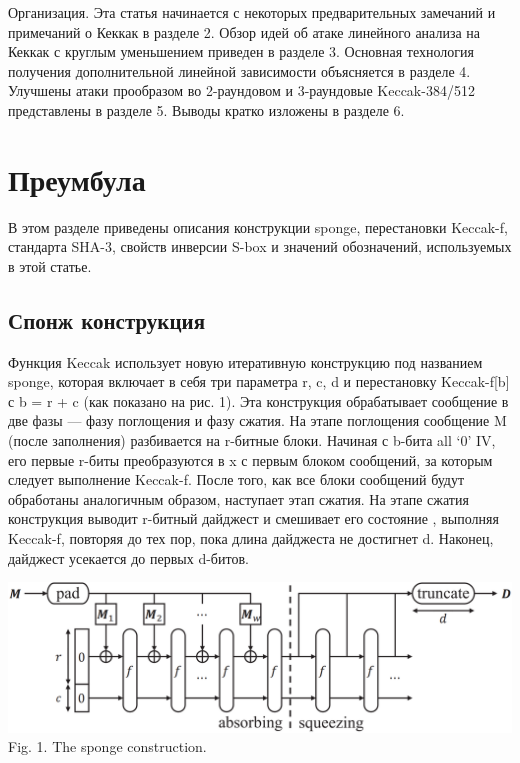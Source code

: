 \documentclass[utf8,14pt,a4paper,oneside,russian]{book}
\begin{document}
Организация. Эта статья начинается с некоторых предварительных замечаний и примечаний о
Кеккак в разделе 2. Обзор идей об атаке линейного анализа на
Кеккак с круглым уменьшением приведен в разделе 3. Основная технология получения дополнительной линейной
зависимости объясняется в разделе 4. Улучшены атаки прообразом во 2-раундовом и
3-раундовые Keccak-384/512 представлены в разделе 5. Выводы кратко
изложены в разделе 6.

\section*{Преумбула}

В этом разделе приведены описания конструкции sponge, перестановки Keccak-f, стандарта SHA-3, свойств инверсии S-box и значений
обозначений, используемых в этой статье.

\subsection*{Спонж конструкция}

Функция Keccak использует новую итеративную конструкцию под названием sponge, которая
включает в себя три параметра r, c, d и перестановку Keccak-f[b] с b = r + c
(как показано на рис. 1). Эта конструкция обрабатывает сообщение в две фазы —
фазу поглощения и фазу сжатия. На этапе поглощения сообщение M (после
заполнения) разбивается на r-битные блоки. Начиная с b-бита all ‘0’ IV, его первые r-биты
преобразуются в x с первым блоком сообщений, за которым следует выполнение Keccak-f.
После того, как все блоки сообщений будут обработаны аналогичным образом, наступает этап сжатия.
На этапе сжатия конструкция выводит r-битный дайджест и смешивает его состояние
, выполняя Keccak-f, повторяя до тех пор, пока длина дайджеста не достигнет d. Наконец,
дайджест усекается до первых d-битов.

\begin{center}
    \includegraphics*[scale=0.3]{2}\\
    Fig. 1. The sponge construction.
\end{center}
\end{document}
